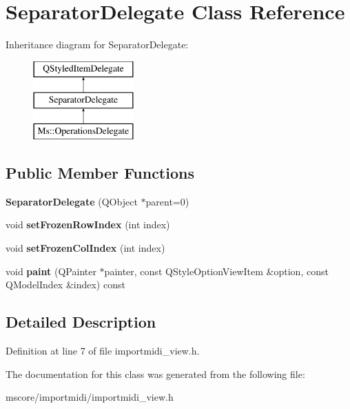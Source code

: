 \hypertarget{class_separator_delegate}{}\section{Separator\+Delegate Class Reference}
\label{class_separator_delegate}
Inheritance diagram for Separator\+Delegate\+:\begin{figure}[H]
\begin{center}
\leavevmode
\includegraphics[height=3.000000cm]{class_separator_delegate}
\end{center}
\end{figure}
\subsection*{Public Member Functions}
\begin{DoxyCompactItemize}
\item 
\mbox{\label{class_separator_delegate_ad5eb4e110d833d7d27a54cbfd964f5fd}} 
{\bfseries Separator\+Delegate} (Q\+Object $\ast$parent=0)
\item 
\mbox{\label{class_separator_delegate_aba4d6bebab377e60a324a338174b73c7}} 
void {\bfseries set\+Frozen\+Row\+Index} (int index)
\item 
\mbox{\label{class_separator_delegate_a0244a79b27b1988ee05ff0be8e303ea5}} 
void {\bfseries set\+Frozen\+Col\+Index} (int index)
\item 
\mbox{\label{class_separator_delegate_a15ae2216611e19c101cb0778d3da649e}} 
void {\bfseries paint} (Q\+Painter $\ast$painter, const Q\+Style\+Option\+View\+Item \&option, const Q\+Model\+Index \&index) const
\end{DoxyCompactItemize}


\subsection{Detailed Description}


Definition at line 7 of file importmidi\+\_\+view.\+h.



The documentation for this class was generated from the following file\+:\begin{DoxyCompactItemize}
\item 
mscore/importmidi/importmidi\+\_\+view.\+h\end{DoxyCompactItemize}
